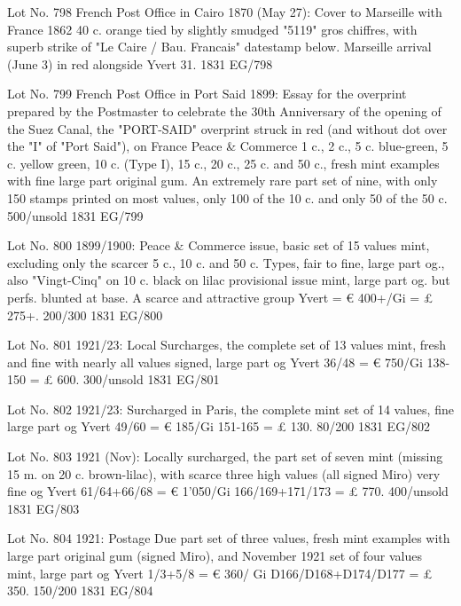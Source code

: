 \documentclass[justified]{tufte-book}
\begin{document}
%
{Lot No. 798
French Post Office in Cairo 1870 (May 27): Cover to Marseille with France 1862 40 c. orange tied by slightly smudged "5119" gros chiffres, with superb strike of "Le Caire / Bau. Francais" datestamp below. Marseille arrival (June 3) in red alongside Yvert 31.}%
{1831}%
{EG/798}%
{}%
{}
{}%
{}

%
{Lot No. 799
French Post Office in Port Said 1899: Essay for the overprint prepared by the Postmaster to celebrate the 30th Anniversary of the opening of the Suez Canal, the "PORT-SAID" overprint struck in red (and without dot over the "I" of "Port Said"), on France Peace \& Commerce 1 c., 2 c., 5 c. blue-green, 5 c. yellow green, 10 c. (Type I), 15 c., 20 c., 25 c. and 50 c., fresh mint examples with fine large part original gum. An extremely rare part set of nine, with only 150 stamps printed on most values, only 100 of the 10 c. and only 50 of the 50 c.  500/unsold }%
{1831}%
{EG/799}%
{}%
{}
{}%
{}



%
{Lot No. 800
1899/1900: Peace \& Commerce issue, basic set of 15 values mint, excluding only the scarcer 5 c., 10 c. and 50 c. Types, fair to fine, large part og., also "Vingt-Cinq" on 10 c. black on lilac provisional issue mint, large part og. but perfs. blunted at base. A scarce and attractive group Yvert = € 400+/Gi = £ 275+.  200/300}%
{1831}%
{EG/800}%
{}%
{}
{}%
{}

%
{Lot No. 801
1921/23: Local Surcharges, the complete set of 13 values mint, fresh and fine with nearly all values signed, large part og Yvert 36/48 = € 750/Gi 138-150 = £ 600. 300/unsold}%
{1831}%
{EG/801}%
{}%
{}
{}%
{}

%
{Lot No. 802
1921/23: Surcharged in Paris, the complete mint set of 14 values, fine large part og Yvert 49/60 = € 185/Gi 151-165 = £ 130. 80/200}%
{1831}%
{EG/802}%
{}%
{}
{}%
{}

%
{Lot No. 803
1921 (Nov): Locally surcharged, the part set of seven mint (missing 15 m. on 20 c. brown-lilac), with scarce three high values (all signed Miro) very fine og Yvert 61/64+66/68 = € 1'050/Gi 166/169+171/173 = £ 770. 400/unsold}%
{1831}%
{EG/803}%
{}%
{}
{}%
{}

%
{Lot No. 804
1921: Postage Due part set of three values, fresh mint examples with large part original gum (signed Miro), and November 1921 set of four values mint, large part og Yvert 1/3+5/8 = € 360/ Gi D166/D168+D174/D177 = £ 350. 150/200}%
{1831}%
{EG/804}%
{}%
{}
{}%
{}
\end{document}
